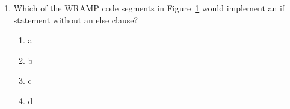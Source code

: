 \documentclass[a4paper,10pt]{article}
\begin{document}
\begin{enumerate}
\begin{enumerate}
 \item arithmetic logic unit
 \item primary storage 
 \item control unit
 \item registers
\end{enumerate}

\begin{figure}[h]
\begin{footnotesize}
\begin{center}
\begin{tabular}{|lp{4cm}|lp{4cm}|}
\hline
(a) &
\begin{verbatim}
       slt   $13, $3, $4
       beqz  $13, label
       ...
label: 
       ...
\end{verbatim}
& (b) &
\begin{verbatim}
       add  $2, $0, $0
label: slei $4, $2, 3
       beqz $4, label2
       ...
       addi $2, $2, 1
       j    label
label2:
       ...     
\end{verbatim}
\\
\hline
(c) &
\begin{verbatim}
       add  $2, $0, $0
label: slti $4, $2, 3
       beqz $4, label2
       ...
       addi $2, $2, 1
       j    label
label2:
       ...
\end{verbatim}
& (d) &
\begin{verbatim}
       slt   $13, $3, $4
       beqz  $13, label
       ...
       j     label2
label:
       ...
label2:
       ...
\end{verbatim}
\\
\hline
\end{tabular}
\end{center}
\end{footnotesize}
\caption{Code for multichoice questions~\ref{ques:multicode}
--~\ref{ques:multicodeend}}
\label{fig:multicode}
\end{figure}

\item 
\label{ques:multicode}
Which of the WRAMP code segments in Figure~\ref{fig:multicode}
would implement an if statement without an else clause?
\begin{enumerate}
  \item a
  \item b
  \item c
  \item d
\end{enumerate}


\end{enumerate}
\end{document}
